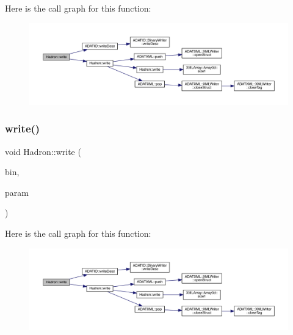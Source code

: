 Here is the call graph for this function\+:\nopagebreak
\begin{figure}[H]
\begin{center}
\leavevmode
\includegraphics[width=350pt]{d1/daf/namespaceHadron_a4beaf6ce4a67fc85ae046f257141250e_cgraph}
\end{center}
\end{figure}
\mbox{\label{namespaceHadron_a53c6ec066bb836eb7474a8a18be8fea7}} 
\subsubsection{\texorpdfstring{write()}{write()}\hspace{0.1cm}{\footnotesize\ttfamily [80/95]}}
{\footnotesize\ttfamily void Hadron\+::write (\begin{DoxyParamCaption}\item[{\mbox{\hyperlink{classADATIO_1_1BinaryWriter}{Binary\+Writer}} \&}]{bin,  }\item[{const \mbox{\hyperlink{structHadron_1_1KeyHadronSUNNPartIrrepOp__t_1_1CGPair__t}{Key\+Hadron\+S\+U\+N\+N\+Part\+Irrep\+Op\+\_\+t\+::\+C\+G\+Pair\+\_\+t}} \&}]{param }\end{DoxyParamCaption})}

Here is the call graph for this function\+:\nopagebreak
\begin{figure}[H]
\begin{center}
\leavevmode
\includegraphics[width=350pt]{d1/daf/namespaceHadron_a53c6ec066bb836eb7474a8a18be8fea7_cgraph}
\end{center}
\end{figure}
\mbox{\label{namespaceHadron_a33192b7d206ee95549b4605c3db6cde8}} 
